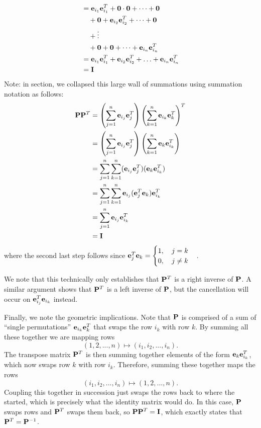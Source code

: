 \documentclass[11pt]{article}
\newcommand{\bvec}[1]{{\bf #1}}
\renewcommand{\vec}[1]{{\bf #1}}
\begin{document}
{\begin{enumerate}[a)]
\begin{align*}
        &= \vec{e}_{i_1}\vec{e}_{i_1}^T + \vec{0} \cdot \vec{0} + \cdots + \vec{0} \\
        &\quad + \vec{0} + \vec{e}_{i_2}\vec{e}_{i_2}^T + \cdots + \vec{0} \\
        &\quad + \vdots \\
        &\quad + \vec{0} + \vec{0} + \cdots + \vec{e}_{i_n}\vec{e}_{i_n}^T \\
        &= \vec{e}_{i_1}\vec{e}_{i_1}^{T} + \vec{e}_{i_2}\vec{e}_{i_2}^{T} + \ldots + \vec{e}_{i_n}\vec{e}_{i_n}^{T} \\
        &= \vec{I}
    \end{align*}
    Note: in section, we collapsed this large wall of summations using summation notation as follows:
    \begin{align*}
        \vec{P}\vec{P}^T &= \left(\sum_{j = 1}^{n} \vec{e}_{i_j}\vec{e}_j^T \right)\left(\sum_{k = 1}^{n} \vec{e}_{i_k}\vec{e}_k^T \right)^T \\
        &= \left(\sum_{j = 1}^{n} \vec{e}_{i_j}\vec{e}_j^T \right) \left(\sum_{k = 1}^{n} \vec{e}_{k}\vec{e}_{i_k}^T \right) \\
        &= \sum_{j = 1}^{n} \sum_{k = 1}^{n} (\vec{e}_{i_j}\vec{e}_j^{T})(\vec{e}_k\vec{e}_{i_k}^T) \\
        &= \sum_{j = 1}^{n} \sum_{k = 1}^{n} \vec{e}_{i_j}(\vec{e}_j^{T}\vec{e}_k)\vec{e}_{i_k}^T \\
        &= \sum_{j = 1}^{n} \vec{e}_{i_j}\vec{e}_{i_k}^T \\
        &= \vec{I}
    \end{align*}
    where the second last step follows since $\vec{e}_j^{T}\vec{e}_k = \begin{cases}1,\quad j = k\\0,\quad j \neq k\end{cases}$.

    We note that this technically only establishes that $\vec{P}^T$ is a right inverse of $\vec{P}$. A similar argument shows that $\vec{P}^T$ is a left inverse of $\vec{P}$, but the cancellation will occur on $\vec{e}_{i_j}^T\vec{e}_{i_k}$ instead.

    Finally, we note the geometric implications. Note that $\bvec{P}$ is comprised of a sum of ``single permutations'' $\vec{e}_{i_k}\vec{e}_k^T$ that swaps the row $i_k$ with row $k$. By summing all these together we are mapping rows $$(1, 2, ..., n) \mapsto (i_1, i_2, ..., i_n).$$
    The transpose matrix $\bvec{P}^T$ is then summing together elements of the form $\bvec{e}_k\bvec{e}_{i_k}^T$, which now swaps row $k$ with row $i_k$. Therefore, summing these together maps the rows $$(i_1, i_2, ..., i_n) \mapsto (1, 2, ..., n).$$
    Coupling this together in succession just swaps the rows back to where the started, which is precisely what the identity matrix would do. In this case, $\vec{P}$ swaps rows and $\vec{P}^{T}$ swaps them back, so $\vec{P}\vec{P}^{T} = \vec{I}$, which exactly states that $\vec{P}^T = \vec{P}^{-1}$.
\end{enumerate}}
\end{document}
